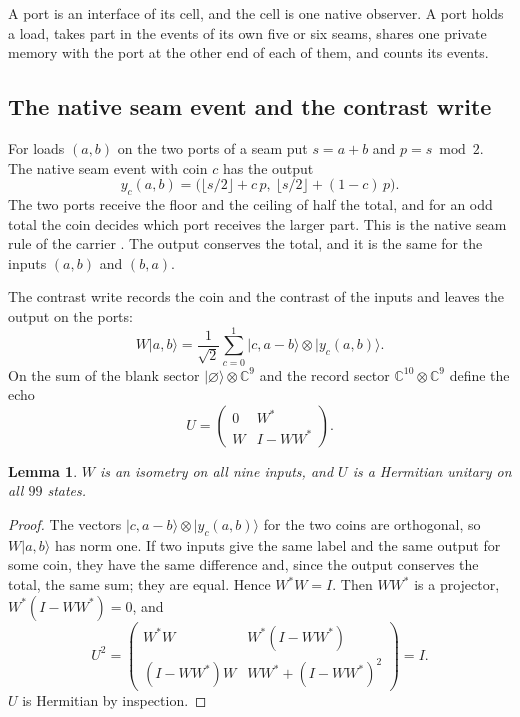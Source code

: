 \documentclass[11pt]{article}
\newtheorem{lemma}[theorem]{Lemma}
\theoremstyle{definition}
\theoremstyle{remark}
\theoremstyle{plain}
\newcommand{\ket}[1]{\lvert #1\rangle}
\newcommand{\C}{\mathbb{C}}
\newcommand{\blank}{\varnothing}
\begin{document}
A port is an interface of its cell, and the cell is one native observer. A
port holds a load, takes part in the events of its own five or six seams,
shares one private memory with the port at the other end of each of them,
and counts its events.

\subsection{The native seam event and the contrast write}

For loads $(a,b)$ on the two ports of a seam put $s=a+b$ and $p=s\bmod 2$.
The native seam event with coin $c$ has the output
\begin{equation}
y_c(a,b)=\bigl(\lfloor s/2\rfloor+c\,p,\ \lfloor s/2\rfloor+(1-c)\,p\bigr).
\label{eq:native}
\end{equation}
The two ports receive the floor and the ceiling of half the total, and for
an odd total the coin decides which port receives the larger part. This is
the native seam rule of the carrier \cite{ophmicro}. The output conserves
the total, and it is the same for the inputs $(a,b)$ and $(b,a)$.

The contrast write records the coin and the contrast of the inputs and
leaves the output on the ports:
\begin{equation}
W\ket{a,b}=\frac1{\sqrt2}\sum_{c=0}^{1}\ket{c,a-b}\otimes\ket{y_c(a,b)} .
\label{eq:write}
\end{equation}
On the sum of the blank sector $\ket{\blank}\otimes\C^9$ and the record
sector $\C^{10}\otimes\C^9$ define the echo
\begin{equation}
U=\begin{pmatrix}0&W^{*}\\ W&I-WW^{*}\end{pmatrix}.
\label{eq:echo}
\end{equation}

\begin{lemma}
\label{lem:write}
$W$ is an isometry on all nine inputs, and $U$ is a Hermitian unitary on
all $99$ states.
\end{lemma}

\begin{proof}
The vectors $\ket{c,a-b}\otimes\ket{y_c(a,b)}$ for the two coins are
orthogonal, so $W\ket{a,b}$ has norm one. If two inputs give the same label
and the same output for some coin, they have the same difference and, since
the output conserves the total, the same sum; they are equal. Hence
$W^{*}W=I$. Then $WW^{*}$ is a projector, $W^{*}(I-WW^{*})=0$, and
\[
U^{2}=\begin{pmatrix}W^{*}W&W^{*}(I-WW^{*})\\ (I-WW^{*})W&WW^{*}+(I-WW^{*})^{2}\end{pmatrix}=I .
\]
$U$ is Hermitian by inspection.
\end{proof}
\end{document}
